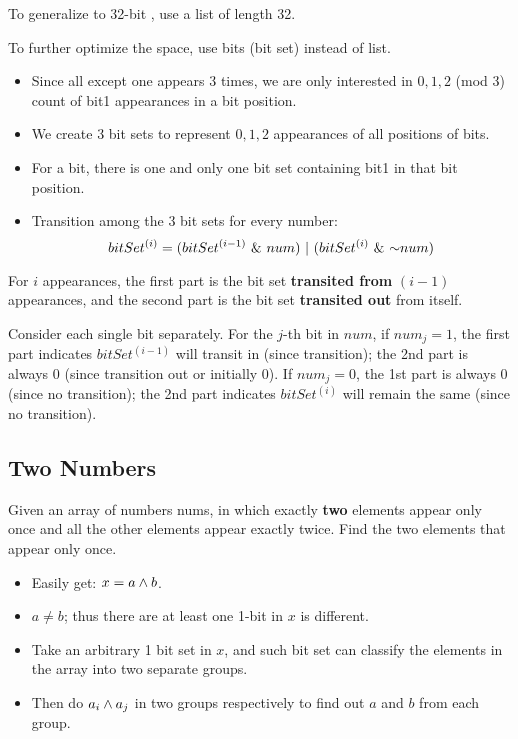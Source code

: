 To generalize to 32-bit , use a list of length 32.

To further optimize the space, use bits (bit set) instead of list. 
\begin{itemize}
\item Since all except one appears 3 times, we are only interested in $0, 1, 2$ (mod 3) count of bit1 appearances in a bit position.
\item We create 3 bit sets to represent $0, 1, 2$ appearances of all positions of bits.
\item For a bit, there is one and only one bit set containing bit1 in that bit position.
\item Transition among the 3 bit sets for every number:
$$
bitSet^{(i)} = (bitSet^{(i-1)}\ \&\  num)\ |\ (bitSet^{(i)}\ \&\  \mathord{\sim} num)
$$
\end{itemize}

For $i$ appearances, the first part is the bit set \textbf{transited from} $(i-1)$ appearances, and the second part is the bit set \textbf{transited out} from itself.

Consider each single bit separately. For the $j$-th bit in $num$, if $num_j=1$, the first part indicates $bitSet^{(i-1)}$ will transit in (since transition); the 2nd part is always 0 (since transition out or initially 0). If $num_j=0$, the 1st part is always 0 (since no transition); the 2nd part indicates $bitSet^{(i)}$ will remain the same (since no transition). 



\subsection{Two Numbers} 
Given an array of numbers nums, in which exactly \textbf{two} elements appear only once and all the other elements appear exactly twice. Find the two elements that appear only once.

\begin{itemize}
\item Easily get: $x = a \wedge b$.
\item $a \neq b$; thus there are at least one 1-bit in $x$ is different.  
\item Take an arbitrary 1 bit set in $x$, and such bit set can classify the elements in the array into two separate groups.
\item Then do $a_i \wedge a_j$ in two groups respectively to find out $a$ and $b$ from each group.
\end{itemize}

